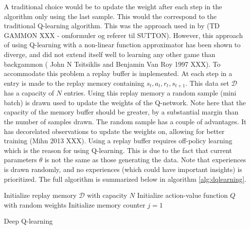 A traditional choice would be to update the weight after each step in the algorithm only using the last sample. This would the correspond to the traditional Q-learning algorithm. This was the approach used in by (TD GAMMON XXX - omformuler og referer til SUTTON). However, this approach of using Q-learning with a non-linear function approximator has been shown to diverge, and did not extend itself well to learning any other game than backgammon ( John N Tsitsiklis and Benjamin Van Roy 1997 XXX). To accommodate this problem a replay buffer is implemented. At each step in a entry is made to the replay memory containing $s_t, a_t, r_t, s_{t+1}$. This data set $\mathcal{D}$ has a capacity of $N$ entries. Using this replay memory a random sample (mini batch) is drawn used to update the weights of the Q-network. Note here that the capacity of the memory buffer should be greater, by a substantial margin than the number of samples drawn. The random sample has a couple of advantages. It has decorelated observations to update the weights on, allowing for better training (Mihn 2013 XXX). Using a replay buffer requires off-policy learning which is the reason for using Q-learning. This is due to the fact that current parameters $\theta$ is not the same as those generating the data. Note that experiences is drawn randomly, and no experiences (which could have important insights) is prioritized. The full algorithm is summarized below in algorithm \ref{alg:dqlearning}.

\begin{algorithm}[H]
\SetAlgoLined
 Initialize replay memory $\mathcal{D}$ with capacity $N$\;
 Initialize action-value function $Q$ with random weights\;
 Initialize memory counter $j=1$\;
\caption{Deep Q-learning}
\label{alg:dqlearning}
\end{algorithm}

